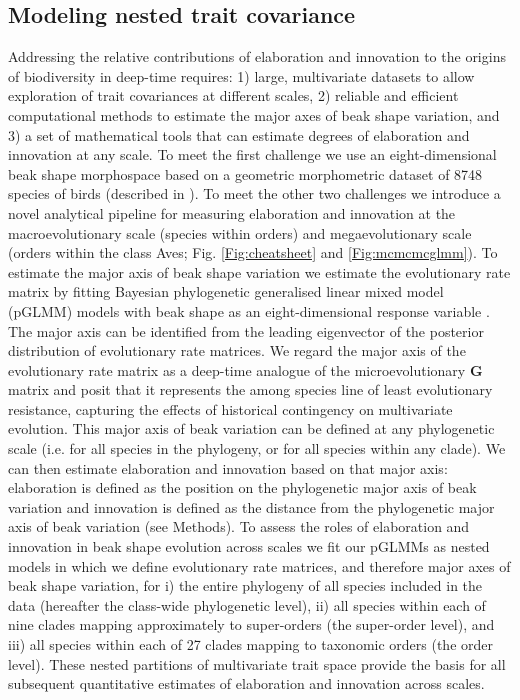 \documentclass[12pt,letterpaper]{article}
\begin{document}
\subsection{Modeling nested trait covariance}
Addressing the relative contributions of elaboration and innovation to the origins of biodiversity in deep-time requires: 1) large, multivariate datasets to allow exploration of trait covariances at different scales, 2) reliable and efficient computational methods to estimate the major axes of beak shape variation, and 3) a set of mathematical tools that can estimate degrees of elaboration and innovation at any scale.
To meet the first challenge we use an eight-dimensional beak shape morphospace based on a geometric morphometric dataset of 8748 species of birds (described in \cite{hughes2022global}).
To meet the other two challenges we introduce a novel analytical pipeline for measuring elaboration and innovation at the macroevolutionary scale (species within orders) and megaevolutionary scale (orders within the class Aves; Fig.
 \ref{Fig:cheatsheet} and \ref{Fig:mcmcmcglmm}).
To estimate the major axis of beak shape variation we estimate the evolutionary rate matrix \cite{Houle2017,Machado2020} by fitting Bayesian phylogenetic generalised linear mixed model (pGLMM) models with beak shape as an eight-dimensional response variable \cite{MCMCglmm}.
The major axis can be identified from the leading eigenvector of the posterior distribution of evolutionary rate matrices.
We regard the major axis of the evolutionary rate matrix as a deep-time analogue of the microevolutionary \textbf{G} matrix \cite{steppan2002comparative, robinson2013quantifying} and posit that it represents the among species line of least evolutionary resistance, capturing the effects of historical contingency on multivariate evolution.
This major axis of beak variation can be defined at any phylogenetic scale (i.e. for all species in the phylogeny, or for all species within any clade).
We can then estimate elaboration and innovation based on that major axis: elaboration is defined as the position on the phylogenetic major axis of beak variation and innovation is defined as the distance from the phylogenetic major axis of beak variation (see Methods). %
To assess the roles of elaboration and innovation in beak shape evolution across scales we fit our pGLMMs as nested models in which we define evolutionary rate matrices, and therefore major axes of beak shape variation, for
i) the entire phylogeny of all species included in the data (hereafter the class-wide phylogenetic level),
ii) all species within each of nine clades mapping approximately to super-orders (the super-order level), and
iii) all species within each of 27 clades mapping to taxonomic orders (the order level).
These nested partitions of multivariate trait space provide the basis for all subsequent quantitative estimates of elaboration and innovation across scales.
\end{document}
